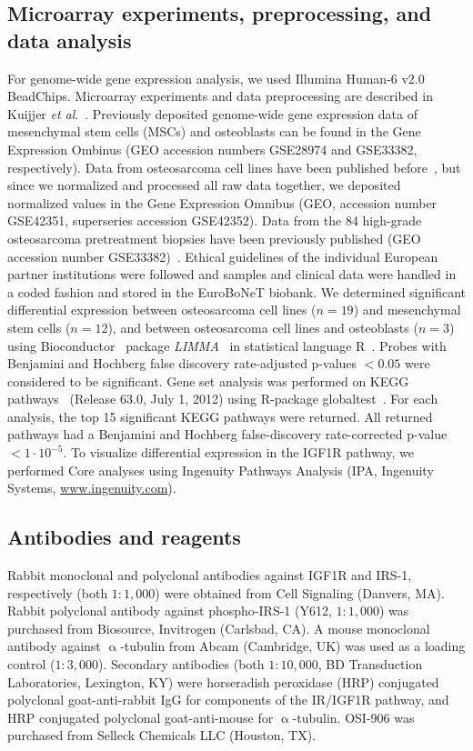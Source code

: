 \subsection{Microarray experiments, preprocessing, and data analysis}
For genome\hyp{}wide gene expression analysis, we used Illumina Human-6 v2.0 BeadChips. Microarray experiments and data preprocessing are described in Kuijjer {\it et al}.~\cite{kuijjer2012identification}. Previously deposited genome\hyp{}wide gene expression data of mesenchymal stem cells (MSCs) and osteoblasts can be found in the Gene Expression Ombinus (GEO accession numbers GSE28974 and GSE33382, respectively). Data from osteosarcoma cell lines have been published before~\cite{namlos2012modulation}, but since we normalized and processed all raw data together, we deposited normalized values in the Gene Expression Omnibus (GEO, accession number GSE42351, superseries accession GSE42352). Data from the 84 high\hyp{}grade osteosarcoma pretreatment biopsies have been previously published (GEO accession number GSE33382)~\cite{kuijjer2012identification}. Ethical guidelines of the individual European partner institutions were followed and samples and clinical data were handled in a coded fashion and stored in the EuroBoNeT biobank. We determined significant differential expression between osteosarcoma cell lines ($n=19$) and mesenchymal stem cells ($n=12$), and between osteosarcoma cell lines and osteoblasts ($n=3$) using Bioconductor~\cite{gentleman2004bioconductor} package {\it LIMMA}~\cite{smyth2004linear} in statistical language R~\cite{r2.15.0}. Probes with Benjamini and Hochberg false discovery rate\hyp{}adjusted p-values $<0.05$ were considered to be significant. Gene set analysis was performed on KEGG pathways~\cite{kanehisa2000kegg} (Release 63.0, July 1, 2012) using R-package globaltest~\cite{goeman2004global}. For each analysis, the top 15 significant KEGG pathways were returned. All returned pathways had a Benjamini and Hochberg false\hyp{}discovery rate\hyp{}corrected p-value $<1\cdot10^{-5}$. To visualize differential expression in the IGF1R pathway, we performed Core analyses using Ingenuity Pathways Analysis (IPA, Ingenuity Systems, \url{www.ingenuity.com}).

\subsection{Antibodies and reagents}
Rabbit monoclonal and polyclonal antibodies against IGF1R and IRS-1, respectively (both $1:1,000$) were obtained from Cell Signaling (Danvers, MA). Rabbit polyclonal antibody against phospho-IRS-1 (Y612, $1:1,000$) was purchased from Biosource, Invitrogen (Carlsbad, CA). A mouse monoclonal antibody against $\upalpha$-tubulin from Abcam (Cambridge, UK) was used as a loading control ($1:3,000$). Secondary antibodies (both $1:10,000$, BD Transduction Laboratories, Lexington, KY) were horseradish peroxidase (HRP) conjugated polyclonal goat\hyp{}anti\hyp{}rabbit IgG for components of the IR/IGF1R pathway, and HRP conjugated polyclonal goat\hyp{}anti\hyp{}mouse for $\upalpha$-tubulin. OSI-906 was purchased from Selleck Chemicals LLC (Houston, TX).

